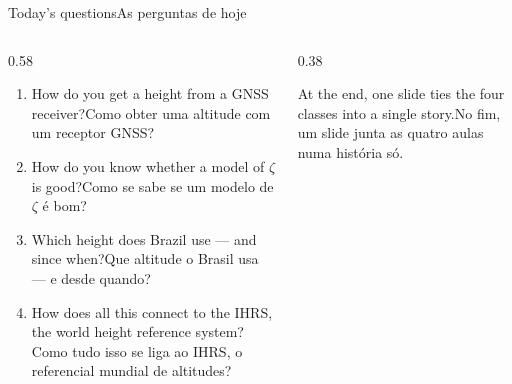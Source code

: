 \documentclass[aspectratio=169,11pt]{beamer}
\newcommand{\tr}[2]{\ifEN#2\else#1\fi}
\begin{document}
\begin{frame}{\tr{As perguntas de hoje}{Today's questions}}
  \begin{columns}[T]
    \begin{column}{0.58\textwidth}
      \begin{enumerate}
        \setlength{\itemsep}{8pt}
        \item \tr{Como obter uma altitude com um receptor GNSS?}{How do you get a height from a
              GNSS receiver?}
        \item \tr{Como se sabe se um modelo de $\zeta$ é bom?}{How do you know whether a model
              of $\zeta$ is good?}
        \item \tr{Que altitude o Brasil usa --- e desde quando?}{Which height does Brazil use
              --- and since when?}
        \item \tr{Como tudo isso se liga ao IHRS, o referencial mundial de altitudes?}{How does
              all this connect to the IHRS, the world height reference system?}
      \end{enumerate}
    \end{column}
    \begin{column}{0.38\textwidth}
      \begin{cuidado}[title={\tr{Última aula}{Last class}}]
        \tr{No fim, um slide junta as quatro aulas numa história só.}{At the end, one slide
        ties the four classes into a single story.}
      \end{cuidado}
    \end{column}
  \end{columns}
\end{frame}
\end{document}
